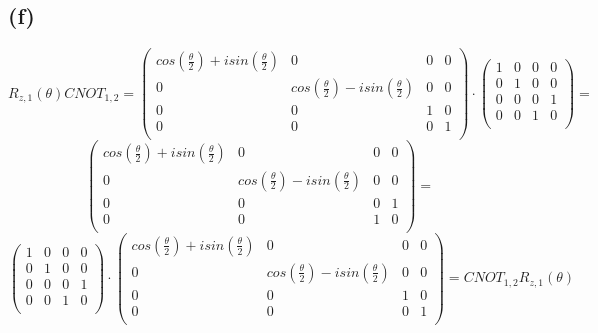 \documentclass{article}
\begin{document}
\subsection*{(f)}

$$R_{z,1}(\theta)CNOT_{1,2}=
\begin{pmatrix}
cos(\frac{\theta}{2})+isin(\frac{\theta}{2}) & 0 & 0 & 0 \\
0 & cos(\frac{\theta}{2})-isin(\frac{\theta}{2}) & 0 & 0 \\
0 & 0 & 1 & 0 \\
0 & 0 & 0 & 1 \\
\end{pmatrix}\cdot
\begin{pmatrix}
1 & 0 & 0 & 0 \\
0 & 1 & 0 & 0 \\
0 & 0 & 0 & 1 \\
0 & 0 & 1 & 0 \\
\end{pmatrix}=
$$
$$
\begin{pmatrix}
cos(\frac{\theta}{2})+isin(\frac{\theta}{2}) & 0 & 0 & 0 \\
0 & cos(\frac{\theta}{2})-isin(\frac{\theta}{2}) & 0 & 0 \\
0 & 0 & 0 & 1 \\
0 & 0 & 1 & 0 \\
\end{pmatrix}=
$$
$$
\begin{pmatrix}
1 & 0 & 0 & 0 \\
0 & 1 & 0 & 0 \\
0 & 0 & 0 & 1 \\
0 & 0 & 1 & 0 \\
\end{pmatrix}\cdot
\begin{pmatrix}
cos(\frac{\theta}{2})+isin(\frac{\theta}{2}) & 0 & 0 & 0 \\
0 & cos(\frac{\theta}{2})-isin(\frac{\theta}{2}) & 0 & 0 \\
0 & 0 & 1 & 0 \\
0 & 0 & 0 & 1 \\
\end{pmatrix}=CNOT_{1,2}R_{z,1}(\theta)
$$
\end{document}
